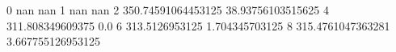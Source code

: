0 nan nan
1 nan nan
2 350.74591064453125 38.93756103515625
4 311.808349609375 0.0
6 313.5126953125 1.704345703125
8 315.4761047363281 3.667755126953125
